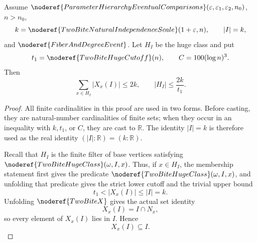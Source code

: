 \begin{lemma}
Assume
\(\noderef{ParameterHierarchyEventualComparisons}
(\varepsilon,\varepsilon_1,\varepsilon_2,n_0)\), \(n>n_0\),
\[
k=\noderef{TwoBiteNaturalIndependenceScale}(1+\varepsilon,n),
\qquad |I|=k,
\]
and \(\noderef{FiberAndDegreeEvent}\).  Let \(H_I\) be the huge class and put
\[
t_1=\noderef{TwoBiteHugeCutoff}(n),\qquad C=100(\log n)^3.
\]
Then
\[
\sum_{x\in H_I}|X_x(I)|\le 2k,
\qquad
|H_I|\le \frac{2k}{t_1}.
\]
\end{lemma}
\begin{proof}
All finite cardinalities in this proof are used in two forms.  Before casting,
they are natural-number cardinalities of finite sets; when they occur in an
inequality with \(k,t_1\), or \(C\), they are cast to \(\mathbb R\).  The
identity \(|I|=k\) is therefore used as the real identity
\((|I|:\mathbb R)=(k:\mathbb R)\).

Recall that \(H_I\) is the finite filter of base vertices satisfying
\(\noderef{TwoBiteHugeClass}(\omega,I,x)\).  Thus, if \(x\in H_I\), the
membership statement first gives the predicate
\(\noderef{TwoBiteHugeClass}(\omega,I,x)\), and unfolding that predicate gives
the strict lower cutoff and the trivial upper bound
\[
t_1<|X_x(I)|\le |I|=k. \tag{1}
\]
Unfolding \(\noderef{TwoBiteX}\) gives the actual set identity
\[
X_x(I)=I\cap N_x,
\]
so every element of \(X_x(I)\) lies in \(I\).  Hence
\[
X_x(I)\subseteq I. \tag{1a}
\]


\end{proof}
